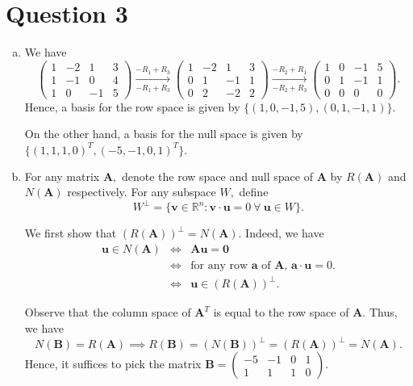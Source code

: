 \documentclass{article}
\newcommand{\matr}[1]{\mathbf{#1}}
\begin{document}
\section*{Question 3}
\begin{enumerate}[(a)]
    \item We have
    $$
    \begin{pmatrix}
    1&-2&1&3\\1&-1&0&4\\1&0&-1&5
    \end{pmatrix}\xrightarrow[-R_1+R_3]{-R_1+R_3}
    \begin{pmatrix}
    1&-2&1&3\\0&1&-1&1\\0&2&-2&2
    \end{pmatrix}\xrightarrow[-R_2+R_3]{-R_2+R_1}
    \begin{pmatrix}
    1&0&-1&5\\0&1&-1&1\\0&0&0&0
    \end{pmatrix}.
    $$
    Hence, a basis for the row space is given by $\{(1,0,-1,5),(0,1,-1,1)\}.$
    
    On the other hand, a basis for the null space is given by $\{(1,1,1,0)^T, (-5,-1,0,1)^T\}.$
    \item For any matrix $\matr{A},$ denote the row space and null space of $\matr{A}$ by $R(\matr{A})$ and $N(\matr{A})$ respectively. For any subspace $W,$ define $$W^{\perp}=\{\matr{v}\in\mathbb{R}^n:\matr{v}\cdot\matr{u}=0\ \forall\  \matr{u}\in W\}.$$
    
    We first show that $(R(\matr{A}))^{\perp}=N(\matr{A}).$ Indeed, we have
    \begin{eqnarray*}
    \matr{u}\in N(\matr{A}) &\iff& \matr{A}\matr{u}=\matr{0}\\
    &\iff& \text {for any row $\matr{a}$ of $\matr{A}$, $\matr{a}\cdot\matr{u}=0.$}\\
    &\iff& \matr{u}\in (R(\matr{A}))^{\perp}.
    \end{eqnarray*}
    
    Observe that the column space of $\matr{A}^T$ is equal to the row space of $\matr{A}.$ Thus, we have $$N(\matr{B})=R(\matr{A})\implies R(\matr{B})=(N(\matr{B}))^{\perp}=(R(\matr{A}))^{\perp}=N(\matr{A}).$$ Hence, it suffices to pick the matrix $\matr{B}=\begin{pmatrix}-5&-1&0&1\\1&1&1&0\end{pmatrix}.$
    

\end{enumerate}
\end{document}
